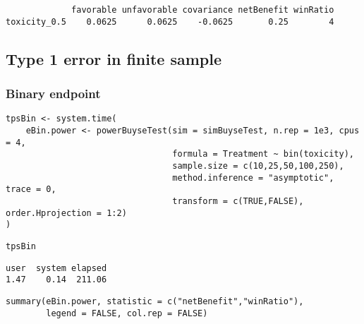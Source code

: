 \documentclass[12pt]{article}
\begin{document}
\begin{verbatim}
             favorable unfavorable covariance netBenefit winRatio
toxicity_0.5    0.0625      0.0625    -0.0625       0.25        4
\end{verbatim}

\clearpage

\subsection{Type 1 error in finite sample}
\label{sec:org1c8f485}

\subsubsection{Binary endpoint}
\label{sec:orgcf554fb}
\lstset{language=r,label= ,caption= ,captionpos=b,numbers=none}
\begin{lstlisting}
tpsBin <- system.time(
	eBin.power <- powerBuyseTest(sim = simBuyseTest, n.rep = 1e3, cpus = 4,
								 formula = Treatment ~ bin(toxicity),
								 sample.size = c(10,25,50,100,250),                                   
								 method.inference = "asymptotic", trace = 0,
								 transform = c(TRUE,FALSE), order.Hprojection = 1:2)
)
\end{lstlisting}

\lstset{language=r,label= ,caption= ,captionpos=b,numbers=none}
\begin{lstlisting}
tpsBin
\end{lstlisting}

\begin{verbatim}
user  system elapsed 
1.47    0.14  211.06
\end{verbatim}

\lstset{language=r,label= ,caption= ,captionpos=b,numbers=none}
\begin{lstlisting}
summary(eBin.power, statistic = c("netBenefit","winRatio"), 
		legend = FALSE, col.rep = FALSE)
\end{lstlisting}
\end{document}
